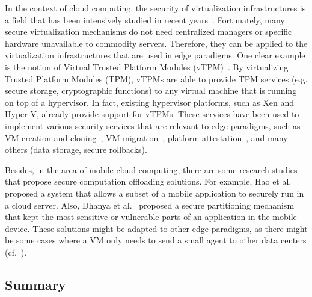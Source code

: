 \documentclass[twocolumn,preprint,3p]{elsarticle}
\begin{document}
In the context of cloud computing, the security of virtualization infrastructures is a field that has been intensively studied in recent years~\cite{Lombardi2014}. Fortunately, many secure virtualization mechanisms do not need centralized managers or specific hardware unavailable to commodity servers. Therefore, they can be applied to the virtualization infrastructures that are used in edge paradigms. One clear example is the notion of Virtual Trusted Platform Modules (vTPM)~\cite{Berger06}. By virtualizing Trusted Platform Modules (TPM), vTPMs are able to provide TPM services (e.g. secure storage, cryptographic functions) to any virtual machine that is running on top of a hypervisor. In fact, existing hypervisor platforms, such as Xen and Hyper-V, already provide support for vTPMs. These services have been used to implement various security services that are relevant to edge paradigms, such as VM creation and cloning~\cite{MaVTPM12}, VM migration~\cite{Mahdi14}, platform attestation~\cite{Jacquin2015}, and many others (data storage, secure rollbacks).

Besides, in the area of mobile cloud computing, there are some research studies that propose secure computation offloading solutions. For example, Hao et al.~\cite{Hao15} proposed a system that allows a subset of a mobile application to securely run in a cloud server. Also, Dhanya et al.~\cite{Dhanya15} proposed a secure partitioning mechanism that kept the most sensitive or vulnerable parts of an application in the mobile device. These solutions might be adapted to other edge paradigms, as there might be some cases where a VM only needs to send a small agent to other data centers (cf.~\cite{Borcea15}).

\subsection{Summary}
\label{sec_cha::summ}
\end{document}
